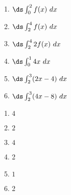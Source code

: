 {\noindent
\begin{minipage}{\linewidth}
\end{minipage}
\begin{enumerate}
\item		$\ds \int_0^2 f(x)\ dx$
\item		$\ds \int_2^4 f(x)\ dx$
\item		$\ds \int_2^4 2f(x)\ dx$
\item		$\ds \int_0^1 4x\ dx$
\item		$\ds \int_2^3 (2x-4)\ dx$
\item		$\ds \int_2^3 (4x-8)\ dx$
\end{enumerate}

}
{\begin{enumerate}
\item		$4$
\item		$2$
\item		$4$
\item		2
\item		$1$
\item		2
\end{enumerate}
}

